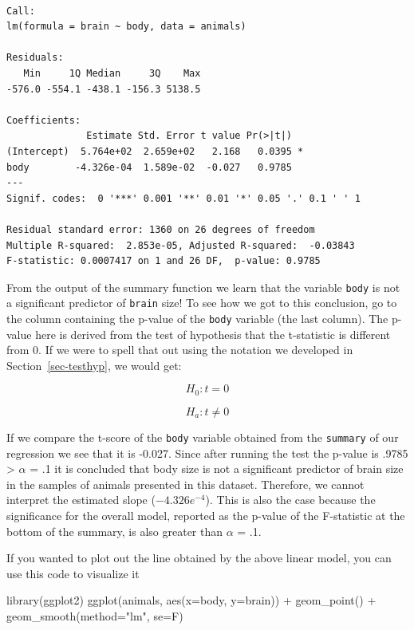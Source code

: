\documentclass[
  letterpaper,
  DIV=11,
  numbers=noendperiod]{scrartcl}
\newenvironment{Shaded}{\begin{snugshade}}{\end{snugshade}}
\newcommand{\AttributeTok}[1]{\textcolor[rgb]{0.40,0.45,0.13}{#1}}
\newcommand{\FunctionTok}[1]{\textcolor[rgb]{0.28,0.35,0.67}{#1}}
\newcommand{\NormalTok}[1]{\textcolor[rgb]{0.00,0.23,0.31}{#1}}
\newcommand{\SpecialCharTok}[1]{\textcolor[rgb]{0.37,0.37,0.37}{#1}}
\newcommand{\StringTok}[1]{\textcolor[rgb]{0.13,0.47,0.30}{#1}}
\newcommand*\circled[1]{\tikz[baseline=(char.base)]{
          \node[shape=circle,draw,inner sep=1pt] (char) {{\scriptsize#1}};}}
\begin{document}
\begin{verbatim}

Call:
lm(formula = brain ~ body, data = animals)

Residuals:
   Min     1Q Median     3Q    Max 
-576.0 -554.1 -438.1 -156.3 5138.5 

Coefficients:
              Estimate Std. Error t value Pr(>|t|)  
(Intercept)  5.764e+02  2.659e+02   2.168   0.0395 *
body        -4.326e-04  1.589e-02  -0.027   0.9785  
---
Signif. codes:  0 '***' 0.001 '**' 0.01 '*' 0.05 '.' 0.1 ' ' 1

Residual standard error: 1360 on 26 degrees of freedom
Multiple R-squared:  2.853e-05, Adjusted R-squared:  -0.03843 
F-statistic: 0.0007417 on 1 and 26 DF,  p-value: 0.9785
\end{verbatim}

From the output of the summary function we learn that the variable
\texttt{body} is not a significant predictor of \texttt{brain} size! To
see how we got to this conclusion, go to the column containing the
p-value of the \texttt{body} variable (the last column). The p-value
here is derived from the test of hypothesis that the t-statistic is
different from 0. If we were to spell that out using the notation we
developed in Section~\ref{sec-testhyp}, we would get:

\[
H_0: t = 0
\]

\[
H_a: t \neq 0
\]

If we compare the t-score of the \texttt{body} variable obtained from
the \texttt{summary} of our regression we see that it is -0.027. Since
after running the test the p-value is .9785 \textgreater{} \(\alpha\) =
.1 it is concluded that body size is not a significant predictor of
brain size in the samples of animals presented in this dataset.
Therefore, we cannot interpret the estimated slope (\(-4.326e^{-4}\)).
This is also the case because the significance for the overall model,
reported as the p-value of the F-statistic at the bottom of the summary,
is also greater than \(\alpha\) = .1.

If you wanted to plot out the line obtained by the above linear model,
you can use this code to visualize it

\label{annotated-cell-26}%
\begin{Shaded}
\begin{Highlighting}[]
\FunctionTok{library}\NormalTok{(ggplot2)}
\FunctionTok{ggplot}\NormalTok{(animals, }\FunctionTok{aes}\NormalTok{(}\AttributeTok{x=}\NormalTok{body, }\AttributeTok{y=}\NormalTok{brain)) }\SpecialCharTok{+} \hspace*{\fill}\NormalTok{\circled{1}}
  \FunctionTok{geom\_point}\NormalTok{() }\SpecialCharTok{+} \hspace*{\fill}\NormalTok{\circled{2}}
  \FunctionTok{geom\_smooth}\NormalTok{(}\AttributeTok{method=}\StringTok{"lm"}\NormalTok{, }\AttributeTok{se=}\NormalTok{F) }\hspace*{\fill}\NormalTok{\circled{3}}
\end{Highlighting}
\end{Shaded}
\end{document}

